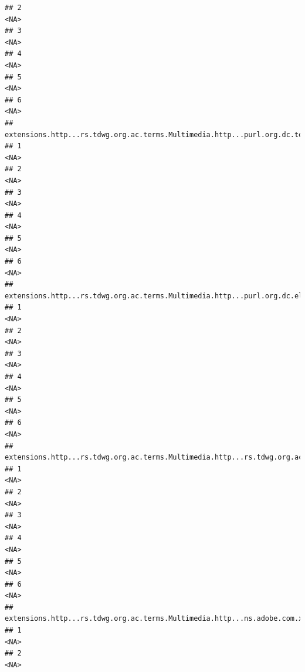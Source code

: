 \documentclass[
]{book}
\begin{document}
\begin{verbatim}
## 2                                                                                     <NA>
## 3                                                                                     <NA>
## 4                                                                                     <NA>
## 5                                                                                     <NA>
## 6                                                                                     <NA>
##   extensions.http...rs.tdwg.org.ac.terms.Multimedia.http...purl.org.dc.terms.creator
## 1                                                                               <NA>
## 2                                                                               <NA>
## 3                                                                               <NA>
## 4                                                                               <NA>
## 5                                                                               <NA>
## 6                                                                               <NA>
##   extensions.http...rs.tdwg.org.ac.terms.Multimedia.http...purl.org.dc.elements.1.1.rights
## 1                                                                                     <NA>
## 2                                                                                     <NA>
## 3                                                                                     <NA>
## 4                                                                                     <NA>
## 5                                                                                     <NA>
## 6                                                                                     <NA>
##   extensions.http...rs.tdwg.org.ac.terms.Multimedia.http...rs.tdwg.org.ac.terms.tag
## 1                                                                              <NA>
## 2                                                                              <NA>
## 3                                                                              <NA>
## 4                                                                              <NA>
## 5                                                                              <NA>
## 6                                                                              <NA>
##   extensions.http...rs.tdwg.org.ac.terms.Multimedia.http...ns.adobe.com.xap.1.0.rights.Owner
## 1                                                                                       <NA>
## 2                                                                                       <NA>

\end{verbatim}
\end{document}
